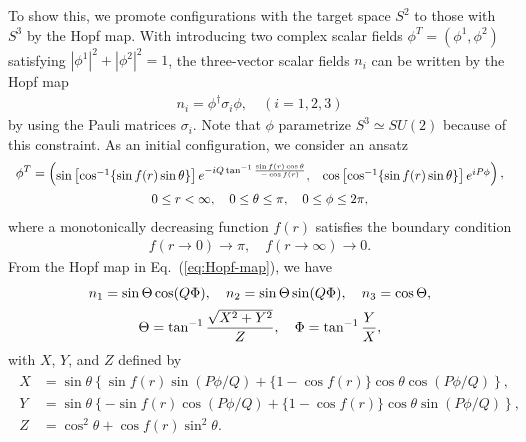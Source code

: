 \documentclass[aps,prd,preprint,
superscriptaddress]{revtex4}
\newcommand {\beq}{\begin{eqnarray}}
\newcommand {\eeq}{\end{eqnarray}}
\newcommand {\1}[1]{\frac{1}{#1}}
\newcommand {\2}[1]{\frac{i}{#1}}
\begin{document}
To show this, we promote configurations with 
the target space $S^2$ to 
those with $S^3$ by the Hopf map.
With introducing two complex scalar fields 
$\phi^T=(\phi^1,\phi^2)$ satisfying 
$|\phi^1|^2+|\phi^2|^2=1$, 
the three-vector scalar fields $n_i$ 
can be written by the Hopf map 
\beq
  n_i = \phi^\dagger \sigma_i \phi , \quad (i=1,2,3)
\label{eq:Hopf-map}
\eeq
by using the Pauli matrices $\sigma_i$.
Note that $\phi$ parametrize $S^3 \simeq SU(2)$ because of this constraint.
As an initial configuration, we consider an ansatz
\begin{align}
\begin{array}{c}
\displaystyle \phi^T = \begin{pmatrix} \sin\left[ \cos^{-1}\{\sin f(r) \sin\theta\} \right] e^{- i Q \tan^{-1} \frac{\sin f(r) \cos\theta}{- \cos f(r)}} , & \cos\left[ \cos^{-1}\{\sin f(r) \sin\theta\} \right] e^{i P \phi} \end{pmatrix} , \vspace{5pt} \\
\displaystyle 0 \leq r < \infty,\quad
0 \leq \theta \leq \pi, \quad
0 \leq \phi \leq 2 \pi,
\end{array}
\label{eq:ansatz}
\end{align}
where a monotonically decreasing function $f(r)$ satisfies
the boundary condition 
\begin{align}
f(r \to 0) \to \pi, \quad
f(r \to \infty) \to 0.
\end{align}
From the Hopf map in Eq.~(\ref{eq:Hopf-map}), 
we have
\begin{align}
\begin{array}{c}
\displaystyle
n_1 = \sin\Theta \cos(Q \Phi), \quad
n_2 = \sin\Theta \sin(Q \Phi), \quad
n_3 = \cos\Theta \vspace{5pt}, \\
\displaystyle
\Theta = \tan^{-1} \frac{\sqrt{X^2 + Y^2}}{Z}, \quad
\Phi = \tan^{-1} \frac{Y}{X},
\end{array} \label{eq:Hopfion}
\end{align}
with $X$, $Y$, and $Z$ defined by
\begin{align}
\begin{split}
X &= \sin\theta\left\{ \sin f(r) \sin(P \phi / Q) + \{ 1 - \cos f(r) \} \cos\theta \cos(P \phi / Q) \right\}, \\
Y &= \sin\theta\left\{ - \sin f(r) \cos(P \phi / Q) + \{ 1 - \cos f(r) \} \cos\theta \sin(P \phi / Q) \right\}, \\
Z &= \cos^2\theta + \cos f(r) \sin^2\theta.
\end{split}
\end{align}
\end{document}
